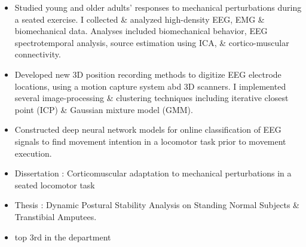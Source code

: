 \documentclass[10pt,letter,ragged2e]{altacv}
\begin{document}
\begin{itemize}
\item Studied young and older adults' responses to mechanical perturbations during a seated exercise. I collected \& analyzed high-density EEG, EMG \& biomechanical data. Analyses included biomechanical behavior, EEG spectrotemporal analysis, source estimation using ICA, \& cortico-muscular connectivity.
\item Developed new 3D position recording methods to digitize EEG electrode locations, using a motion capture system abd 3D scanners. I implemented several image-processing \& clustering techniques including iterative closest point (ICP) \& Gaussian mixture model (GMM).
\item Constructed deep neural network models for online classification of EEG signals to find movement intention in a locomotor task prior to movement execution.
\end{itemize}



\begin{itemize}
\item Dissertation : Corticomuscular adaptation to mechanical perturbations in a seated locomotor task
\end{itemize}

\divider

\begin{itemize}
\item Thesis : Dynamic Postural Stability Analysis on Standing Normal Subjects \& Transtibial Amputees.
\end{itemize}

\divider

\begin{itemize}
\item top 3rd in the department
\end{itemize}

\clearpage


\nocite{*}
\end{document}
